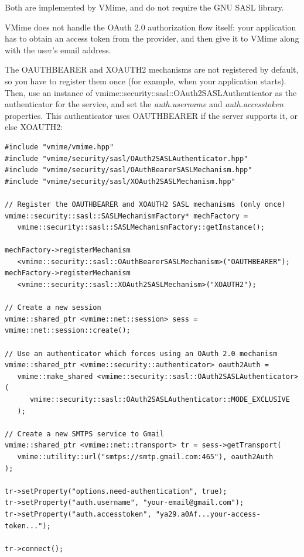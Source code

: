 Both are implemented by VMime, and do not require the GNU SASL library.

VMime does not handle the OAuth 2.0 authorization flow itself: your
application has to obtain an access token from the provider, and then give
it to VMime along with the user's email address.

The OAUTHBEARER and XOAUTH2 mechanisms are not registered by default, so you
have to register them once (for example, when your application starts).
Then, use an instance of {\vcode vmime::security::sasl::OAuth2SASLAuthenticator}
as the authenticator for the service, and set the \emph{auth.username} and
\emph{auth.accesstoken} properties. This authenticator uses OAUTHBEARER if
the server supports it, or else XOAUTH2:

\begin{lstlisting}[caption={Connecting to Gmail using OAuth 2.0}]
#include "vmime/vmime.hpp"
#include "vmime/security/sasl/OAuth2SASLAuthenticator.hpp"
#include "vmime/security/sasl/OAuthBearerSASLMechanism.hpp"
#include "vmime/security/sasl/XOAuth2SASLMechanism.hpp"

// Register the OAUTHBEARER and XOAUTH2 SASL mechanisms (only once)
vmime::security::sasl::SASLMechanismFactory* mechFactory =
   vmime::security::sasl::SASLMechanismFactory::getInstance();

mechFactory->registerMechanism
   <vmime::security::sasl::OAuthBearerSASLMechanism>("OAUTHBEARER");
mechFactory->registerMechanism
   <vmime::security::sasl::XOAuth2SASLMechanism>("XOAUTH2");

// Create a new session
vmime::shared_ptr <vmime::net::session> sess = vmime::net::session::create();

// Use an authenticator which forces using an OAuth 2.0 mechanism
vmime::shared_ptr <vmime::security::authenticator> oauth2Auth =
   vmime::make_shared <vmime::security::sasl::OAuth2SASLAuthenticator>(
      vmime::security::sasl::OAuth2SASLAuthenticator::MODE_EXCLUSIVE
   );

// Create a new SMTPS service to Gmail
vmime::shared_ptr <vmime::net::transport> tr = sess->getTransport(
   vmime::utility::url("smtps://smtp.gmail.com:465"), oauth2Auth
);

tr->setProperty("options.need-authentication", true);
tr->setProperty("auth.username", "your-email@gmail.com");
tr->setProperty("auth.accesstoken", "ya29.a0Af...your-access-token...");

tr->connect();
\end{lstlisting}

